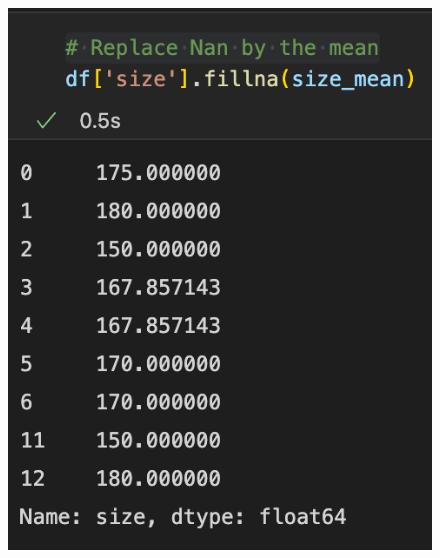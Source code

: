 \begin{frame}
\begin{minipage}{0.18\linewidth}
\begin{figure}[H]
         \includegraphics[scale=.35]{../images/illustrations/data_cleaning_na_imputation_const_4.png}
      \end{figure}
   \end{minipage}
      
\end{frame}


